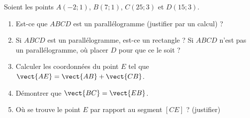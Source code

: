 
\begin{exercice}\label{exosmath-0669}

    Soient les points \( A(-2;1)\), \( B(7;1)\), \( C(25;3)\) et \( D(15;3)\).
    \begin{enumerate}
        \item
            Est-ce que \( ABCD\) est un parallélogramme (justifier par un calcul) ? 
        \item
            Si \( ABCD\) est un parallélogramme, est-ce un rectangle ? Si \( ABCD\) n'est pas un parallélogramme, où placer \( D\) pour que ce le soit ?
        \item
            Calculer les coordonnées du point \( E\) tel que \( \vect{ AE }=\vect{ AB }+\vect{ CB }\).
        \item
            Démontrer que \( \vect{ BC }=\vect{ EB }\).
        \item
            Où se trouve le point \( E\) par rapport au segment \( [CE]\) ? (justifier)
    \end{enumerate}

\end{exercice}
